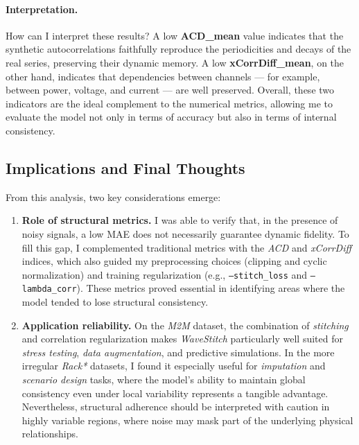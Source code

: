 \paragraph{Interpretation.}
How can I interpret these results?  
A low \textbf{ACD\_mean} value indicates that the synthetic autocorrelations faithfully reproduce the periodicities and decays of the real series, preserving their dynamic memory.  
A low \textbf{xCorrDiff\_mean}, on the other hand, indicates that dependencies between channels — for example, between power, voltage, and current — are well preserved.  
Overall, these two indicators are the ideal complement to the numerical metrics, allowing me to evaluate the model not only in terms of accuracy but also in terms of internal consistency.

\subsection{Implications and Final Thoughts}
From this analysis, two key considerations emerge:

\begin{enumerate}
  \item \textbf{Role of structural metrics.}  
  I was able to verify that, in the presence of noisy signals, a low MAE does not necessarily guarantee dynamic fidelity.  
  To fill this gap, I complemented traditional metrics with the \emph{ACD} and \emph{xCorrDiff} indices, which also guided my preprocessing choices (clipping and cyclic normalization) and training regularization (e.g., \texttt{--stitch\_loss} and \texttt{--lambda\_corr}).  
  These metrics proved essential in identifying areas where the model tended to lose structural consistency.

  \item \textbf{Application reliability.}  
  On the \emph{M2M} dataset, the combination of \emph{stitching} and correlation regularization makes \emph{WaveStitch} particularly well suited for \emph{stress testing}, \emph{data augmentation}, and predictive simulations.  
  In the more irregular \emph{Rack*} datasets, I found it especially useful for \emph{imputation} and \emph{scenario design} tasks, where the model’s ability to maintain global consistency even under local variability represents a tangible advantage.  
  Nevertheless, structural adherence should be interpreted with caution in highly variable regions, where noise may mask part of the underlying physical relationships.
\end{enumerate}
